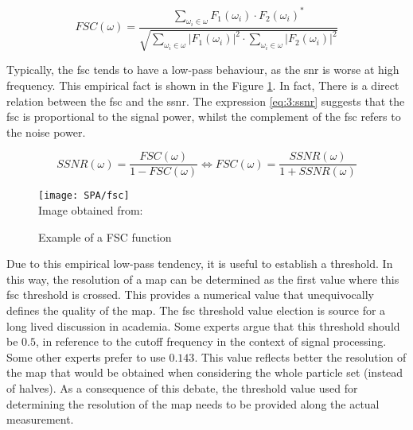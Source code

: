 \documentclass[../main.tex]{subfiles}
\begin{document}
\begin{equation}\label{eq:3:fsc}
    FSC(\omega) =   \frac{
                        \sum_{\omega_i \in \omega} F_1(\omega_i) \cdot F_2(\omega_i)^*
                    }{
                        \sqrt{\sum_{\omega_i \in \omega} |F_1(\omega_i)|^2 \cdot \sum_{\omega_i \in \omega} |F_2(\omega_i)|^2}
                    }
\end{equation}

Typically, the \gls{fsc} tends to have a low-pass behaviour, as the \gls{snr} is worse at high frequency. This empirical fact is shown in the Figure \ref{fig:3:fsc}.  In fact, There is a direct relation between the \gls{fsc} and the \gls{ssnr}. The expression \eqref{eq:3:ssnr} suggests that the \gls{fsc} is proportional to the signal power, whilst the complement of the \gls{fsc} refers to the noise power.

\begin{equation}\label{eq:3:ssnr}
    SSNR(\omega) = \frac{FSC(\omega)}{1 - FSC(\omega)} \Leftrightarrow FSC(\omega) = \frac{SSNR(\omega)}{1 + SSNR(\omega)}
\end{equation}

\begin{figure}[htbp]
    \centering
    \texttt{[image: SPA/fsc]}\\
    Image obtained from: \cite{dubach2020}
    \caption{Example of a FSC function}
    \label{fig:3:fsc}
\end{figure}

Due to this empirical low-pass tendency, it is useful to establish a threshold. In this way, the resolution of a map can be determined as the first value where this \gls{fsc} threshold is crossed. This provides a numerical value that unequivocally defines the quality of the map. The \gls{fsc} threshold value election is source for a long lived discussion in academia. Some experts argue that this threshold should be $0.5$, in reference to the cutoff frequency in the context of signal processing. Some other experts prefer to use $0.143$. This value reflects better the resolution of the map that would be obtained when considering the whole particle set (instead of halves)\cite{chen2013}. As a consequence of this debate, the threshold value used for determining the resolution of the map needs to be provided along the actual measurement.
\end{document}
